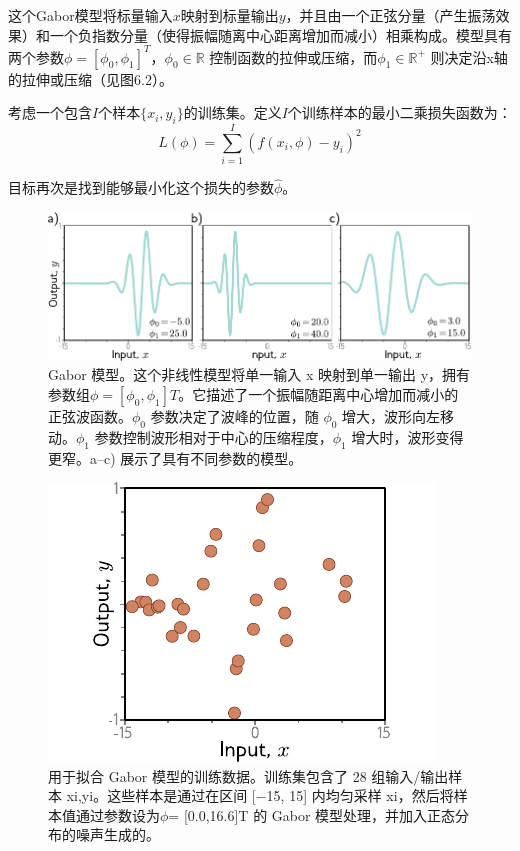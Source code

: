 \documentclass[lang=cn,newtx,10pt,scheme=chinese]{elegantbook}
\begin{document}
这个Gabor模型将标量输入\(x\)映射到标量输出\(y\)，并且由一个正弦分量（产生振荡效果）和一个负指数分量（使得振幅随离中心距离增加而减小）相乘构成。模型具有两个参数\(\phi = [\phi_0, \phi_1]^T\)，\(\phi_0 \in \mathbb{R}\) 控制函数的拉伸或压缩，而\(\phi_1 \in \mathbb{R}^+\) 则决定沿x轴的拉伸或压缩（见图6.2）。

考虑一个包含\(I\)个样本\(\{x_i, y_i\}\)的训练集。定义\(I\)个训练样本的最小二乘损失函数为：
\begin{equation}
L(\phi) = \sum_{i=1}^I (f(x_i, \phi) - y_i)^2 
\end{equation}

目标再次是找到能够最小化这个损失的参数\(\hat{\phi}\)。

\begin{figure}[ht!]
\centering
\includegraphics[width=0.7\linewidth]{PDFFigures/UDLChap6PDF/TrainGaborModel.pdf}
\caption{Gabor 模型。这个非线性模型将单一输入 x 映射到单一输出 y，拥有参数组\(\phi= [\phi_0 , \phi_1]T\)。它描述了一个振幅随距离中心增加而减小的正弦波函数。\(\phi_0\) 参数决定了波峰的位置，随 \(\phi_0\) 增大，波形向左移动。\(\phi_1\) 参数控制波形相对于中心的压缩程度，\(\phi_1\) 增大时，波形变得更窄。a–c) 展示了具有不同参数的模型。}
\end{figure}
	
\begin{figure}[ht!]
\centering
\includegraphics[width=0.7\linewidth]{PDFFigures/UDLChap6PDF/TrainGaborData.pdf}
\caption{用于拟合 Gabor 模型的训练数据。训练集包含了 28 组输入/输出样本 {xi,yi}。这些样本是通过在区间 [−15, 15] 内均匀采样 xi，然后将样本值通过参数设为\(\phi\)= [0.0,16.6]T 的 Gabor 模型处理，并加入正态分布的噪声生成的。}
\end{figure}
\end{document}
